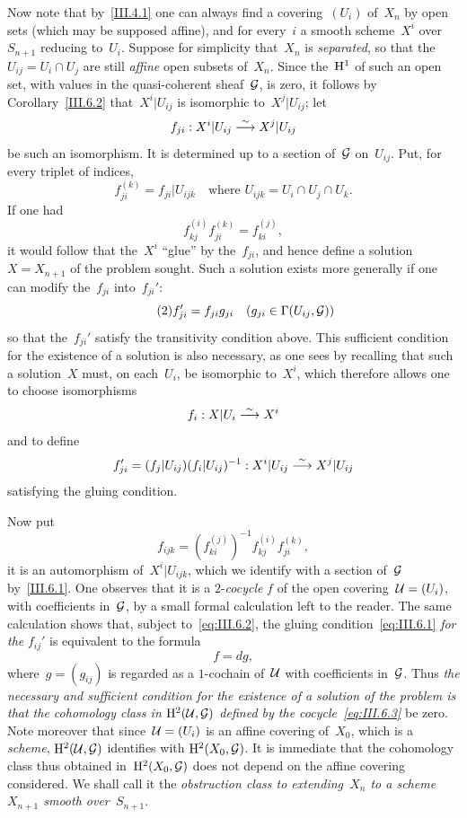 Now note that by~\ref{III.4.1} one can always find a covering~$(U_i)$ of~$X_n$ by open sets (which may be supposed affine), and for every~$i$ a smooth scheme~$X^i$ over~$S_{n+1}$ reducing to~$U_i$. Suppose for simplicity that~$X_n$ is \emph{separated}, so that the~$U_{ij}=U_i\cap U_j$ are still \emph{affine} open subsets of~$X_n$. Since the~$\H^1$ of such an open set, with values in the quasi-coherent sheaf~$\cal{G}$, is zero, it follows by Corollary~\ref{III.6.2} that~$X^i|U_{ij}$ is isomorphic to~$X^j|U_{ij}$; let
$$
f_{ji}:X^i|U_{ij}\isomto X^j|U_{ij}
$$
be such an isomorphism. It is determined up to a section of~$\cal{G}$ on~$U_{ij}$. Put, for every triplet of indices,
$$
f_{ji}^{(k)}=f_{ji}|U_{ijk}\quad\text{where }U_{ijk}=U_i\cap U_j\cap U_k.
$$
If one had
\begin{equation*}
\label{eq:III.6.1}
\tag{1} {f_{kj}^{(i)}f_{ji}^{(k)}=f_{ki}^{(j)},}
\end{equation*}
it would follow that the~$X^i$ ``glue'' by the~$f_{ji}$, and hence define a solution~$X=X_{n+1}$ of the problem sought. Such a solution exists more generally if one can modify the~$f_{ji}$ into~$f_{ji}'$:
\begin{equation*}
\label{eq:III.6.2}
\tag{2} {f_{ji}'=f_{ji}g_{ji}\quad (g_{ji}\in\Gamma(U_{ij},\cal{G}))}
\end{equation*}
so that the~$f_{ji}'$ satisfy the transitivity condition above. This sufficient condition for the existence of a solution is also necessary, as one sees by recalling that such a solution~$X$ must, on each~$U_i$, be isomorphic to~$X^i$, which therefore allows one to choose isomorphisms
$$
f_i:X|U_i\isomto X^i
$$
and to define
$$
f_{ji}'=(f_j|U_{ij})(f_i|U_{ij})^{-1}:X^i|U_{ij}\isomto X^j|U_{ij}
$$
satisfying the gluing condition.

Now put
\begin{equation*}
\label{eq:III.6.3}
\tag{3}
{f_{ijk}=(f_{ki}^{(j)})^{-1}f_{kj}^{(i)}f_{ji}^{(k)},}
\end{equation*}
it is an automorphism of~$X^i|U_{ijk}$, which we identify with a section of~$\cal{G}$ by~\ref{III.6.1}. One observes that it is a $2$-\emph{cocycle} $f$ of the open covering~$\cal{U}=(U_i)$, with coefficients in~$\cal{G}$, by a small formal calculation left to the reader. The same calculation shows that, subject to~\eqref{eq:III.6.2}, the gluing condition~\eqref{eq:III.6.1} \emph{for the} $f_{ij}'$ is equivalent to the formula
\begin{equation*}
\label{eq:III.6.4}
\tag{4} {f=dg,}
\end{equation*}
where~$g=(g_{ij})$ is regarded as a $1$-cochain of~$\cal{U}$ with coefficients in~$\cal{G}$. Thus \emph{the necessary and sufficient condition for the existence of a solution of the problem is that the cohomology class in $\H^2(\cal{U},\cal{G})$ defined by the cocycle~\eqref{eq:III.6.3}} be zero. Note moreover that since~$\cal{U}=(U_i)$ is an affine covering of~$X_0$, which is a \emph{scheme}, $\H^2(\cal{U},\cal{G})$ identifies with $\H^2(X_0,\cal{G})$. It is immediate that the cohomology class thus obtained in~$\H^2(X_0,\cal{G})$ does not depend on the affine covering considered. We shall call it the \emph{obstruction class to extending~$X_n$ to a scheme~$X_{n+1}$ smooth over~$S_{n+1}$}.

